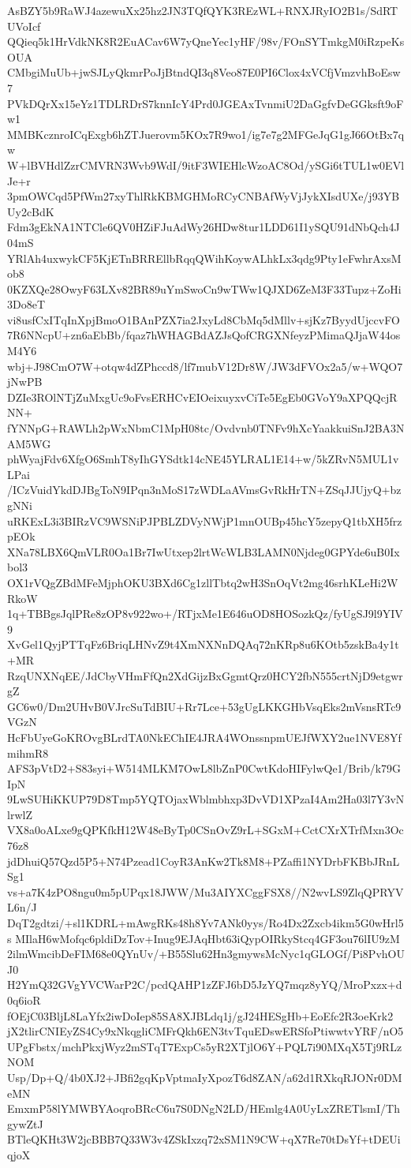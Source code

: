 AsBZY5b9RaWJ4azewuXx25hz2JN3TQfQYK3REzWL+RNXJRyIO2B1s/SdRTUVoIcf
QQieq5k1HrVdkNK8R2EuACav6W7yQneYec1yHF/98v/FOnSYTmkgM0iRzpeKsOUA
CMbgiMuUb+jwSJLyQkmrPoJjBtndQI3q8Veo87E0PI6Clox4xVCfjVmzvhBoEsw7
PVkDQrXx15eYz1TDLRDrS7knnIcY4Prd0JGEAxTvnmiU2DaGgfvDeGGksft9oFw1
MMBKcznroICqExgb6hZTJuerovm5KOx7R9wo1/ig7e7g2MFGeJqG1gJ66OtBx7qw
W+lBVHdlZzrCMVRN3Wvb9WdI/9itF3WIEHlcWzoAC8Od/ySGi6tTUL1w0EVlJe+r
3pmOWCqd5PfWm27xyThlRkKBMGHMoRCyCNBAfWyVjJykXIsdUXe/j93YBUy2cBdK
Fdm3gEkNA1NTCle6QV0HZiFJuAdWy26HDw8tur1LDD61I1ySQU91dNbQch4J04mS
YRlAh4uxwykCF5KjETnBRREllbRqqQWihKoywALhkLx3qdg9Pty1eFwhrAxsMob8
0KZXQe28OwyF63LXv82BR89uYmSwoCn9wTWw1QJXD6ZeM3F33Tupz+ZoHi3Do8eT
vi8usfCxITqInXpjBmoO1BAnPZX7ia2JxyLd8CbMq5dMllv+sjKz7ByydUjccvFO
7R6NNcpU+zn6aEbBb/fqaz7hWHAGBdAZJsQofCRGXNfeyzPMimaQJjaW44osM4Y6
wbj+J98CmO7W+otqw4dZPhccd8/lf7mubV12Dr8W/JW3dFVOx2a5/w+WQO7jNwPB
DZIe3ROlNTjZuMxgUc9oFvsERHCvEIOeixuyxvCiTe5EgEb0GVoY9aXPQQcjRNN+
fYNNpG+RAWLh2pWxNbmC1MpH08tc/Ovdvnb0TNFv9hXcYaakkuiSnJ2BA3NAM5WG
phWyajFdv6XfgO6SmhT8yIhGYSdtk14cNE45YLRAL1E14+w/5kZRvN5MUL1vLPai
/ICzVuidYkdDJBgToN9IPqn3nMoS17zWDLaAVmsGvRkHrTN+ZSqJJUjyQ+bzgNNi
uRKExL3i3BIRzVC9WSNiPJPBLZDVyNWjP1mnOUBp45hcY5zepyQ1tbXH5frzpEOk
XNa78LBX6QmVLR0Oa1Br7IwUtxep2lrtWcWLB3LAMN0Njdeg0GPYde6uB0Ixbol3
OX1rVQgZBdMFeMjphOKU3BXd6Cg1zllTbtq2wH3SnOqVt2mg46srhKLeHi2WRkoW
1q+TBBgsJqlPRe8zOP8v922wo+/RTjxMe1E646uOD8HOSozkQz/fyUgSJ9l9YIV9
XvGel1QyjPTTqFz6BriqLHNvZ9t4XmNXNnDQAq72nKRp8u6KOtb5zskBa4y1t+MR
RzqUNXNqEE/JdCbyVHmFfQn2XdGijzBxGgmtQrz0HCY2fbN555crtNjD9etgwrgZ
GC6w0/Dm2UHvB0VJrcSuTdBIU+Rr7Lce+53gUgLKKGHbVsqEks2mVsnsRTc9VGzN
HcFbUyeGoKROvgBLrdTA0NkEChIE4JRA4WOnssnpmUEJfWXY2ue1NVE8YfmihmR8
AFS3pVtD2+S83syi+W514MLKM7OwL8lbZnP0CwtKdoHIFylwQe1/Brib/k79GIpN
9LwSUHiKKUP79D8Tmp5YQTOjaxWblmbhxp3DvVD1XPzaI4Am2Ha03l7Y3vNlrwlZ
VX8a0oALxe9gQPKfkH12W48eByTp0CSnOvZ9rL+SGxM+CctCXrXTrfMxn3Oc76z8
jdDhuiQ57Qzd5P5+N74Pzead1CoyR3AnKw2Tk8M8+PZaffi1NYDrbFKBbJRnLSg1
vs+a7K4zPO8ngu0m5pUPqx18JWW/Mu3AIYXCggFSX8//N2wvLS9ZlqQPRYVL6n/J
DqT2gdtzi/+sl1KDRL+mAwgRKs48h8Yv7ANk0yys/Ro4Dx2Zxcb4ikm5G0wHrl5s
MIlaH6wMofqc6pldiDzTov+Inug9EJAqHbt63iQypOIRkyStcq4GF3ou76lIU9zM
2ilmWmcibDeFIM68e0QYnUv/+B55Slu62Hn3gmywsMcNyc1qGLOGf/Pi8PvhOUJ0
H2YmQ32GVgYVCWarP2C/pcdQAHP1zZFJ6bD5JzYQ7mqz8yYQ/MroPxzx+d0q6ioR
fOEjC03BljL8LaYfx2iwDoIep85SA8XJBLdq1j/gJ24HESgHb+EoEfc2R3oeKrk2
jX2tlirCNIEyZS4Cy9xNkqgliCMFrQkh6EN3tvTquEDswERSfoPtiwwtvYRF/nO5
UPgFbstx/mchPkxjWyz2mSTqT7ExpCs5yR2XTjlO6Y+PQL7i90MXqX5Tj9RLzNOM
Usp/Dp+Q/4b0XJ2+JBfi2gqKpVptmaIyXpozT6d8ZAN/a62d1RXkqRJONr0DMeMN
EmxmP58lYMWBYAoqroBRcC6u7S0DNgN2LD/HEmlg4A0UyLxZRETlsmI/ThgywZtJ
BTleQKHt3W2jcBBB7Q33W3v4ZSkIxzq72xSM1N9CW+qX7Re70tDsYf+tDEUiqjoX
